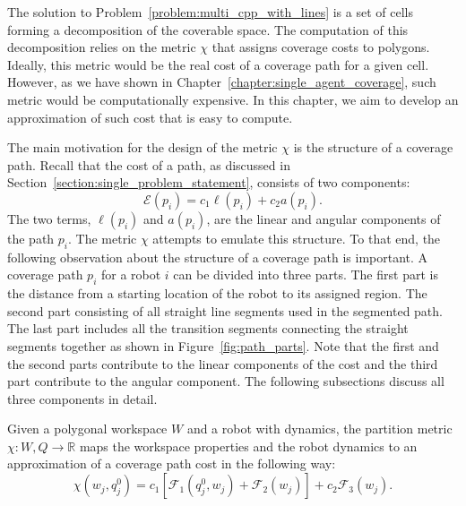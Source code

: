 \documentclass[../main.tex]{subfiles}
\begin{document}
The solution to Problem~\ref{problem:multi_cpp_with_lines} is a set of cells forming a decomposition of the coverable space. The computation of this decomposition relies on the metric $\chi$ that assigns coverage costs to polygons. Ideally, this metric would be the real cost of a coverage path for a given cell. However, as we have shown in Chapter~\ref{chapter:single_agent_coverage}, such metric would be computationally expensive. In this chapter, we aim to develop an approximation of such cost that is easy to compute. 

The main motivation for the design of the metric $\chi$ is the structure of a coverage path. Recall that the cost of a path, as discussed in Section~\ref{section:single_problem_statement}, consists of two components:
\begin{equation}
	\mathcal{E}(p_i)=c_1\ell(p_i)+c_2a(p_i).
\end{equation}
The two terms, $\ell(p_i)$ and $a(p_i)$, are the linear and angular components of the path $p_i$. The metric $\chi$ attempts to emulate this structure. To that end, the following observation about the structure of a coverage path is important. A coverage path $p_i$ for a robot $i$ can be divided into three parts. The first part is the distance from a starting location of the robot to its assigned region. The second part consisting of all straight line segments used in the segmented path. The last part includes all the transition segments connecting the straight segments together as shown in Figure~\ref{fig:path_parts}. Note that the first and the second parts contribute to the linear components of the cost and the third part contribute to the angular component. The following subsections discuss all three components in detail.


\begin{definition}
Given a polygonal workspace $W$ and a robot with dynamics, the partition metric $\chi:W,Q\to\mathbb{R}$ maps the workspace properties and the robot dynamics to an approximation of a coverage path cost in the following way:
	\begin{equation}
		\chi(w_j,q_j^0)=c_1[\mathcal{F}_1(q^0_j,w_j)+\mathcal{F}_2(w_j)]+c_2\mathcal{F}_3(w_j).
	\end{equation}
\end{definition}
\end{document}
